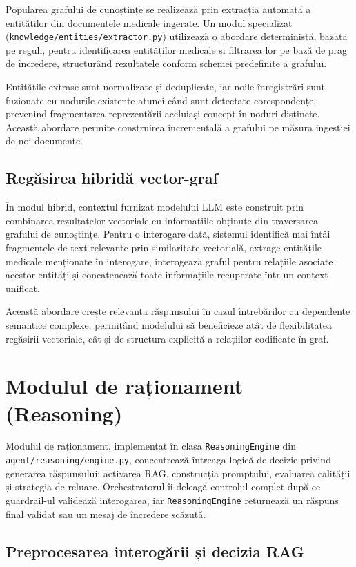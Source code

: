 \documentclass[12pt, a4paper, oneside, romanian]{teza-upb}
\begin{document}
Popularea grafului de cunoștințe se realizează prin extracția automată a entităților din documentele medicale ingerate. Un modul specializat (\texttt{knowledge/entities/extractor.py}) utilizează o abordare deterministă, bazată pe reguli, pentru identificarea entităților medicale și filtrarea lor pe bază de prag de încredere, structurând rezultatele conform schemei predefinite a grafului.

Entitățile extrase sunt normalizate și deduplicate, iar noile înregistrări sunt fuzionate cu nodurile existente atunci când sunt detectate corespondențe, prevenind fragmentarea reprezentării aceluiași concept în noduri distincte. Această abordare permite construirea incrementală a grafului pe măsura ingestiei de noi documente.

\subsection{Regăsirea hibridă vector-graf}

În modul hibrid, contextul furnizat modelului LLM este construit prin combinarea rezultatelor vectoriale cu informațiile obținute din traversarea grafului de cunoștințe. Pentru o interogare dată, sistemul identifică mai întâi fragmentele de text relevante prin similaritate vectorială, extrage entitățile medicale menționate în interogare, interogează graful pentru relațiile asociate acestor entități și concatenează toate informațiile recuperate într-un context unificat.

Această abordare crește relevanța răspunsului în cazul întrebărilor cu dependențe semantice complexe, permițând modelului să beneficieze atât de flexibilitatea regăsirii vectoriale, cât și de structura explicită a relațiilor codificate în graf.

\section{Modulul de raționament (Reasoning)}

Modulul de raționament, implementat în clasa \texttt{ReasoningEngine} din \texttt{agent/reasoning/engine.py}, concentrează întreaga logică de decizie privind generarea răspunsului: activarea RAG, construcția promptului, evaluarea calității și strategia de reluare. Orchestratorul îi deleagă controlul complet după ce guardrail-ul validează interogarea, iar \texttt{ReasoningEngine} returnează un răspuns final validat sau un mesaj de încredere scăzută.

\subsection{Preprocesarea interogării și decizia RAG}
\end{document}
